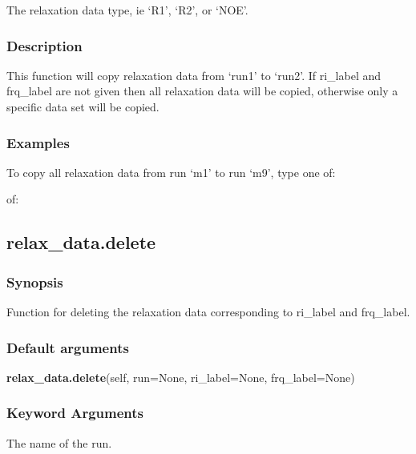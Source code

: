   The relaxation data type, ie `R1', `R2', or `NOE'.


\subsubsection{Description}

This function will copy relaxation data from `run1' to `run2'.  If ri\_label and frq\_label
are not given then all relaxation data will be copied, otherwise only a specific data set
will be copied.


\subsubsection{Examples}

To copy all relaxation data from run `m1' to run `m9', type one of:



of:




\newpage

\subsection{relax\_data.delete}


\subsubsection{Synopsis}

Function for deleting the relaxation data corresponding to ri\_label and frq\_label.

\subsubsection{Default arguments}

\textsf{\textbf{relax\_data.delete}(self, run=None, ri\_label=None, frq\_label=None)}


\subsubsection{Keyword Arguments}

  The name of the run.

